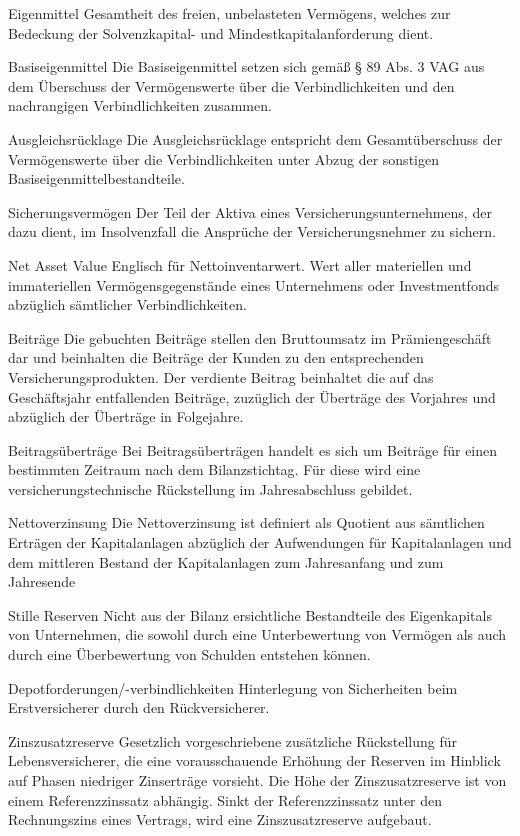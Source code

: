 Eigenmittel
Gesamtheit des freien, unbelasteten Vermögens, welches zur Bedeckung der Solvenzkapital- und Mindestkapitalanforderung dient. 

Basiseigenmittel
Die Basiseigenmittel setzen sich gemäß § 89 Abs. 3
VAG aus dem Überschuss der Vermögenswerte über
die Verbindlichkeiten und den nachrangigen Verbindlichkeiten zusammen. 

Ausgleichsrücklage
Die Ausgleichsrücklage entspricht dem Gesamtüberschuss der Vermögenswerte über die Verbindlichkeiten
unter Abzug der sonstigen Basiseigenmittelbestandteile.

Sicherungsvermögen
Der Teil der Aktiva eines Versicherungsunternehmens, der dazu dient,
im Insolvenzfall die Ansprüche der Versicherungsnehmer zu sichern. 

Net Asset Value
Englisch für Nettoinventarwert. Wert aller materiellen und immateriellen Vermögensgegenstände 
eines Unternehmens oder Investmentfonds abzüglich sämtlicher Verbindlichkeiten. 

Beiträge
Die gebuchten Beiträge stellen den Bruttoumsatz im Prämiengeschäft
dar und beinhalten die Beiträge der Kunden zu den entsprechenden
Versicherungsprodukten. Der verdiente Beitrag beinhaltet die auf das
Geschäftsjahr entfallenden Beiträge, zuzüglich der Überträge des Vorjahres und abzüglich der Überträge in Folgejahre.

Beitragsüberträge
Bei Beitragsüberträgen handelt es sich um Beiträge für einen bestimmten Zeitraum nach dem Bilanzstichtag. 
Für diese wird eine versicherungstechnische Rückstellung im Jahresabschluss gebildet. 

Nettoverzinsung
Die Nettoverzinsung ist definiert als Quotient aus sämtlichen Erträgen
der Kapitalanlagen abzüglich der Aufwendungen für Kapitalanlagen
und dem mittleren Bestand der Kapitalanlagen zum Jahresanfang und
zum Jahresende

Stille Reserven
Nicht aus der Bilanz ersichtliche Bestandteile des Eigenkapitals von Unternehmen, die sowohl durch eine Unterbewertung von Vermögen als
auch durch eine Überbewertung von Schulden entstehen können. 

Depotforderungen/-verbindlichkeiten
Hinterlegung von Sicherheiten beim Erstversicherer durch den Rückversicherer. 


Zinszusatzreserve
Gesetzlich vorgeschriebene zusätzliche Rückstellung für Lebensversicherer, die eine vorausschauende Erhöhung der Reserven im Hinblick
auf Phasen niedriger Zinserträge vorsieht. Die Höhe der Zinszusatzreserve ist von einem Referenzzinssatz abhängig. Sinkt der Referenzzinssatz unter den Rechnungszins eines Vertrags, wird eine Zinszusatzreserve aufgebaut. 
